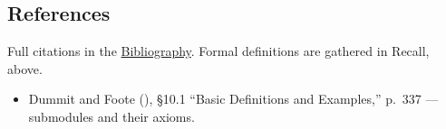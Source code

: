 \subsection{References}\label{sec:10-modules:04-submodules:4}

Full citations in the \hyperref[sec:root:bibliography:1]{Bibliography}. Formal definitions are gathered in Recall, above.

\begin{itemize}
\tightlist
\item
  Dummit and Foote (\cite{DummitFoote2003}), §10.1 ``Basic Definitions and Examples,'' p.~337 --- submodules and their axioms.
\end{itemize}
